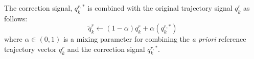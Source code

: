 The correction signal,  ${q}_{k}^{r,*}$ is combined with the original trajectory signal ${q}_{k}^{r}$ as follows:
	\begin{equation}
	 	\tilde{q}_{k}^{r} 	\leftarrow (1-\alpha) {q}_{k}^{r} + \alpha ( {q}_{k}^{r,*} )
		\label{eq::correction_application}
	\end{equation}
where  $\alpha \in (0,1)$ is a mixing parameter for combining the \emph{a priori} reference trajectory vector ${q}_{k}^{r}$ and the correction 
signal ${q}_{k}^{r,*}$.